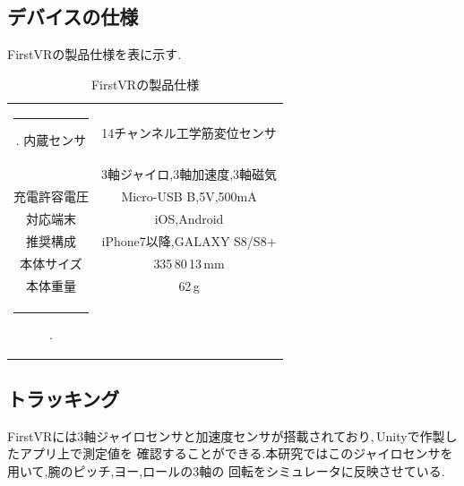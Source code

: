 \documentclass{ltjsreport}
\makeatletter
\def\Hline{
  \noalign{\ifnum0=`}\fi\hrule \@height 3.\arrayrulewidth \futurelet
  \reserved@a\@xhline}
\makeatother
\begin{document}
		\subsection{デバイスの仕様}
			FirstVRの製品仕様を表に示す.
			\begin{table}[H]
			\begin{center}
			\caption{FirstVRの製品仕様}
			\label{tab:FirstVR}
			\begin{tabular}{c|c} \Hline
				内蔵センサ&14チャンネル工学筋変位センサ\\
				&3軸ジャイロ,3軸加速度,3軸磁気\\ \hline
				充電許容電圧&Micro-USB B,5V,500mA\\
				対応端末&iOS,Android\\
				推奨構成&iPhone7以降,GALAXY S8/S8+\\ \hline
				本体サイズ&335\times\,80\times\,13\,mm\\
				本体重量&62\,g\\ \Hline
			\end{tabular}
			\end{center}
			\hspace{-32truemm}
			\end{table}
			\vspace{-15pt}
		\subsection{トラッキング}
			FirstVRには3軸ジャイロセンサと加速度センサが搭載されており,\,Unityで作製したアプリ上で測定値を
			確認することができる.本研究ではこのジャイロセンサを用いて,腕のピッチ,ヨー,ロールの3軸の
			回転をシミュレータに反映させている.
\end{document}
